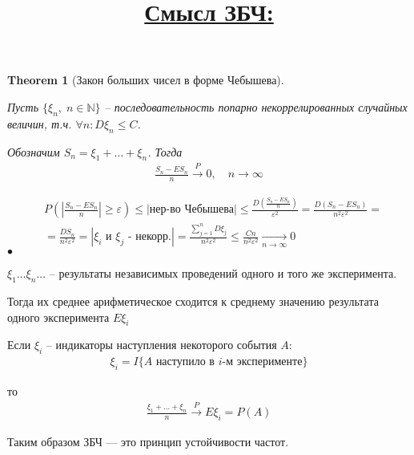 \documentclass[a4paper]{article}
\theoremstyle{plain}
\newtheorem{theorem}{Theorem}
\theoremstyle{remark}
\theoremstyle{definition}
\renewenvironment{proof}{{\bfseries Proof}}{$\bullet$}
\newcommand{\pars}[1]{\left( #1 \right)}
\newcommand{\setN}{\mathbb{N}}
\newcommand{\walls}[1]{\left | #1 \right |} %
\newcommand{\expl}[1]{\walls{\text{#1}}} %
\newcommand{\toup}[1]{\xrightarrow{#1}}
\newcommand{\todown}[1]{\xrightarrow[#1]{}}
\renewcommand{\epsilon}{\varepsilon}
\renewcommand{\leq}{\leqslant}
\renewcommand{\geq}{\geqslant}
\newcommand{\bigtitle}[1]{\title{\textbf{\underline{#1}}}}
\begin{document}
\begin{theorem}[Закон больших чисел в форме Чебышева]~

  Пусть $\{ \xi_n,\; n \in \setN \}$ -- последовательность попарно некоррелированных случайных величин, т.ч. $\forall n : D\xi_n \leq C$.

  Обозначим $S_n = \xi_1 + \ldots + \xi_n$. Тогда
  \begin{align*}
    \frac{S_n - E S_n}{n} \toup{P} 0, \quad n \to \infty
  \end{align*}

\end{theorem}

\begin{proof}
  \begin{align*}
    &P\pars{\walls{\frac{S_n - E S_n}{n}} \geq \epsilon} \leq \expl{нер-во Чебышева}
    \leq \frac{D\pars{\frac{S_n - E S_n}{n}}}{\epsilon^2} = 
    \frac{D(S_n - E S_n)}{n^2 \epsilon^2} =\\
    &= \frac{D S_n}{n^2 \epsilon^2} = \expl{$\xi_i$ и $\xi_j$ - некорр.}
    = \frac{\sum_{j = 1}^n D \xi_j}{n^2 \epsilon^2} \leq 
    \frac{C n}{n^2 \epsilon^2} \todown{n \to \infty} 0
  \end{align*}
\end{proof}


\bigtitle{Смысл ЗБЧ:}

$\xi_1 \ldots \xi_n \ldots$ -- результаты независимых проведений одного и того же эксперимента. 

Тогда их среднее арифметическое сходится к среднему значению результата одного эксперимента $E\xi_i$

Если $\xi_i$ -- индикаторы наступления некоторого события $A$:
\begin{align*}
  \xi_i = I \{ A \text{ наступило в $i$-м эксперименте}\}
\end{align*}

то
\begin{align*}
  \frac{\xi_1 + \ldots + \xi_n}{n} \toup{P} E \xi_i = P(A)
\end{align*}

Таким образом ЗБЧ --- это принцип устойчивости частот.
\end{document}
